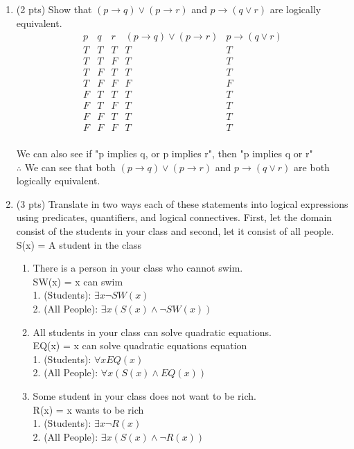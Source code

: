 \documentclass[12pt]{article}
\begin{document}
\begin{enumerate}
\begin{enumerate}
\end{enumerate}

\item  (2 pts)
Show that $(p \rightarrow q) \vee (p \rightarrow r) $ and $p \rightarrow (q \vee r)$ are logically equivalent.
\begin{displaymath}
    \begin{array}{|c|c|c|c|c|}
    p & q & r & (p \rightarrow q) \lor (p \rightarrow r) & p \rightarrow (q \lor r)\\
    \hline
      T & T & T & T & T\\
      T & T & F & T & T\\
      T & F & T & T & T\\
      T & F & F & F & F\\
      F & T & T & T & T\\
      F & T & F & T & T\\
      F & F & T & T & T\\
      F & F & F & T & T

    \end{array}
    \end{displaymath}
    \\We can also see if "p implies q,   or p implies r", then "p implies q or r"
    \\$\therefore$ We can see that both $(p \rightarrow q) \lor (p \rightarrow r)$ and $p \rightarrow (q \lor r)$ are both logically equivalent.

\item (3 pts)
Translate in two ways each of these statements into logical
expressions using predicates, quantifiers, and logical
connectives. First, let the domain consist of the students
in your class and second, let it consist of all people.
\\S(x) = A student in the class
\begin{enumerate}
	\item There is a person in your class who cannot swim.
    \\SW(x) = x can swim
    \\1. (Students): $\exists x \lnot SW(x)$
    \\2. (All People): $\exists x (S(x) \land \lnot SW(x)) $\\
	\item All students in your class can solve quadratic equations.
    \\EQ(x) = x can solve quadratic equations equation
    \\1. (Students): $\forall x EQ(x)$
    \\2. (All People): $\forall x (S(x) \land EQ(x))$\\
	\item  Some student in your class does not want to be rich.
    \\R(x) = x wants to be rich
    \\1. (Students): $\exists x \lnot R(x)$
    \\2. (All People): $\exists x (S(x) \land \lnot R(x))$\\
\end{enumerate}


\end{enumerate}
\end{document}
